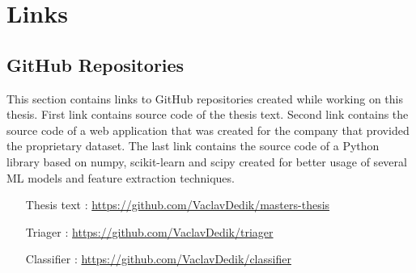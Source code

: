 \documentclass[nopalatino,nolot,nolof,color]{fithesis3}
\begin{document}
 \chapter{Links}

 \section{GitHub Repositories}

 This section contains links to GitHub repositories created while working on this thesis. First link contains source code of the thesis text. Second link contains the source code of a web application that was created for the company that provided the proprietary dataset. The last link contains the source code of a Python library based on numpy, scikit-learn and scipy created for better usage of several ML models and feature extraction techniques.

 \begin{itemize}
   \item[Thesis text]: \url{https://github.com/VaclavDedik/masters-thesis}
   \item[Triager]: \url{https://github.com/VaclavDedik/triager}
   \item[Classifier]: \url{https://github.com/VaclavDedik/classifier}
 \end{itemize}

 \todos
\end{document}
